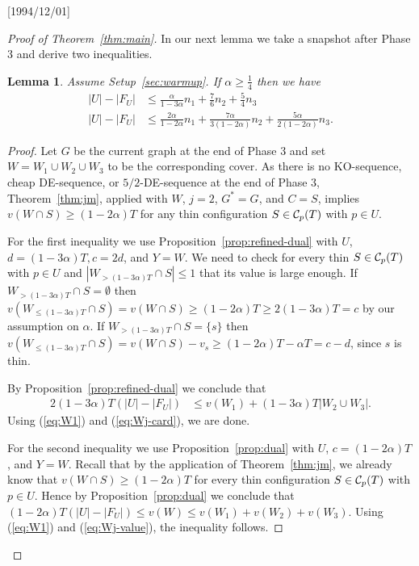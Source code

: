 \NeedsTeXFormat{LaTeX2e}[1994/12/01]\documentclass[letterpaper, 11pt]{article}
\newtheorem{lem}[thm]{Lemma}
\theoremstyle{definition}
\theoremstyle{remark}
\numberwithin{equation}{section}
\begin{document}
\begin{proof}[Proof of Theorem~\ref{thm:main}]
In our next lemma we take a snapshot after Phase 3 and derive two
inequalities. 

\begin{lem}\label{lem:phase3} Assume Setup~\ref{sec:warmup}. If $\alpha \geq \frac{1}{4}$  then we have
  \begin{align}
      |U|-|F_U| & \leq \frac{\alpha}{1-3\alpha}n_1+\frac76n_2
  +\frac54n_3  \label{eq:phase31} \\
 |U|-|F_U| & \leq
  \frac{2\alpha}{1-2\alpha}n_1+\frac{7\alpha}{3(1-2\alpha)}n_{2} 
           +\frac{5\alpha}{2(1-2\alpha)}n_{3}. \label{eq:phase32}
           \end{align}
\end{lem}
\begin{proof} 
  Let $G$ be the current graph at the end of Phase 3 and
  set $W=W_1\cup W_2\cup W_3$ to be the corresponding cover.
As there is no KO-sequence, cheap DE-sequence, or 
$5/2$-DE-sequence at the end of Phase 3,
Theorem~\ref{thm:jm}, applied with $W$, $j=2$, $G^*=G$, and $C=S$,
implies $v(W\cap S) \geq (1-2\alpha)T$ for any thin configuration
$S \in {\cal C}_p(T)$ with $p\in U$.

For the first inequality
we use Proposition~\ref{prop:refined-dual} with $U$, $d=(1-3\alpha)T, c=2d$, and
$Y=W$. We need to check for every thin $S \in {\cal C}_p(T)$ with $p\in U$
and $|W_{>(1-3\alpha)T}\cap S|\leq 1$ that its value is large enough.
If $W_{>(1-3\alpha)T}\cap S =\emptyset$ then 
$v(W_{\leq (1-3\alpha)T} \cap S) = v(W\cap S) \geq (1-2\alpha)T \geq 2(1-3\alpha)T=c$ by our assumption on $\alpha$.
If $W_{> (1-3\alpha)T}\cap S = \{ s\}$ then
$v(W_{\leq (1-3\alpha)T} \cap S) = v(W\cap S) - v_s \geq (1-2\alpha)T -\alpha T=c-d$, since $s$
is thin. 

By Proposition~\ref{prop:refined-dual} we conclude that
\begin{align*}
  2(1-3\alpha)T(|U| - |F_U|) &  \leq v(W_1) + (1-3\alpha)T|W_2 \cup W_3|.
\end{align*}
Using (\ref{eq:W1}) and (\ref{eq:Wj-card}), we are done.

For the second inequality
we use Proposition~\ref{prop:dual} with $U$, $c=(1-2\alpha)T$, and
$Y=W$. Recall that by the application of Theorem~\ref{thm:jm},
we already know that $v(W\cap S) \geq
(1-2\alpha)T$ for every thin configuration 
$S \in {\cal C}_p(T)$ with $p\in U$. 
Hence by Proposition~\ref{prop:dual} we conclude that
$(1-2\alpha)T(|U|-|F_U|) \leq v(W) \leq v(W_1) + v(W_2) + v(W_3)$.
Using (\ref{eq:W1}) and (\ref{eq:Wj-value}), the inequality follows.
\end{proof}


\end{proof}
\end{document}
